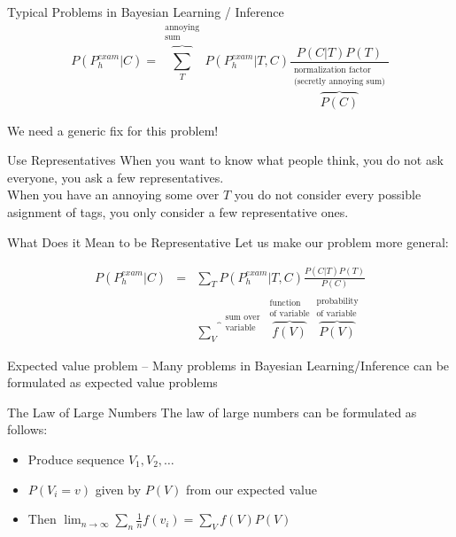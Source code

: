 \documentclass[11pt]{beamer}
\begin{document}
	
	\begin{frame}{Typical Problems in Bayesian Learning / Inference }
		$$P(P_{h}^{exam}|C) = \overbrace{\sum_{T}}^{\substack{\mbox{annoying} \\ \mbox{sum}}} P(P_{h}^{exam}|T,C) \frac{P(C|T)P(T)}{\overbrace{P(C)}^{\substack{\mbox{normalization factor} \\ \mbox{(secretly annoying sum)}}}}$$
		
		\vspace{10pt} We need a generic fix for this problem!
	\end{frame}
	
	\begin{frame}{Use Representatives}
		When you want to know what people think, you do not ask everyone, you ask a few representatives.\\[10pt]
		When you have an annoying some over $T$ you do not consider every possible asignment of tags, you only consider a few representative ones.
	\end{frame}
	
	\begin{frame}{What Does it Mean to be Representative}
		Let us make our problem more general:
		
		\begin{align*}
			P(P_{h}^{exam}|C) & = & \sum_{T} P(P_{h}^{exam}|T,C) \frac{P(C|T)P(T)}{P(C)} \\
			& & \overbrace{\sum_{V}}^{\substack{\mbox{sum over}\\\mbox{variable}}} \overbrace{f(V)}^{\substack{\mbox{function} \\ \mbox{of variable}}} \overbrace{P(V)}^{\substack{\mbox{probability} \\ \mbox{of variable}}}
		\end{align*}
		
		\vspace{10pt} Expected value problem -- Many problems in Bayesian Learning/Inference can be formulated as expected value problems
	\end{frame}
	
	
	\begin{frame}{The Law of Large Numbers}
		The law of large numbers can be formulated as follows:
		
		\begin{itemize}
			\item Produce sequence $V_1,V_2,\dots$
			\item $P(V_i = v)$ given by $P(V)$ from our expected value
			\item Then $\lim_{n \rightarrow \infty} \sum_{n} \frac{1}{n} f(v_i) = \sum_{V} f(V) P(V)$
		\end{itemize}
	\end{frame}
	
\end{document}
